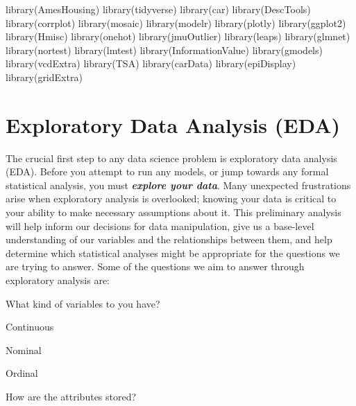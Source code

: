 \documentclass[
  letterpaper,
  DIV=11,
  numbers=noendperiod]{scrreprt}
\newenvironment{Shaded}{\begin{snugshade}}{\end{snugshade}}
\newcommand{\FunctionTok}[1]{\textcolor[rgb]{0.28,0.35,0.67}{#1}}
\newcommand{\NormalTok}[1]{\textcolor[rgb]{0.00,0.23,0.31}{#1}}
\begin{document}
\begin{Shaded}
\begin{Highlighting}[]
\FunctionTok{library}\NormalTok{(AmesHousing)}
\FunctionTok{library}\NormalTok{(tidyverse)}
\FunctionTok{library}\NormalTok{(car)}
\FunctionTok{library}\NormalTok{(DescTools)}
\FunctionTok{library}\NormalTok{(corrplot)}
\FunctionTok{library}\NormalTok{(mosaic)}
\FunctionTok{library}\NormalTok{(modelr)}
\FunctionTok{library}\NormalTok{(plotly)}
\FunctionTok{library}\NormalTok{(ggplot2)}
\FunctionTok{library}\NormalTok{(Hmisc)}
\FunctionTok{library}\NormalTok{(onehot)}
\FunctionTok{library}\NormalTok{(jmuOutlier)}
\FunctionTok{library}\NormalTok{(leaps)}
\FunctionTok{library}\NormalTok{(glmnet)}
\FunctionTok{library}\NormalTok{(nortest)}
\FunctionTok{library}\NormalTok{(lmtest)}
\FunctionTok{library}\NormalTok{(InformationValue)}
\FunctionTok{library}\NormalTok{(gmodels)}
\FunctionTok{library}\NormalTok{(vcdExtra)}
\FunctionTok{library}\NormalTok{(TSA)}
\FunctionTok{library}\NormalTok{(carData)}
\FunctionTok{library}\NormalTok{(epiDisplay)}
\FunctionTok{library}\NormalTok{(gridExtra)}
\end{Highlighting}
\end{Shaded}

\hypertarget{sec-eda}{%
\section{Exploratory Data Analysis (EDA)}\label{sec-eda}}

The crucial first step to any data science problem is exploratory data
analysis (EDA). Before you attempt to run any models, or jump towards
any formal statistical analysis, you must \textbf{\emph{explore your
data}}. Many unexpected frustrations arise when exploratory analysis is
overlooked; knowing your data is critical to your ability to make
necessary assumptions about it. This preliminary analysis will help
inform our decisions for data manipulation, give us a base-level
understanding of our variables and the relationships between them, and
help determine which statistical analyses might be appropriate for the
questions we are trying to answer. Some of the questions we aim to
answer through exploratory analysis are:

What kind of variables to you have?

Continuous

Nominal

Ordinal

How are the attributes stored?
\end{document}
